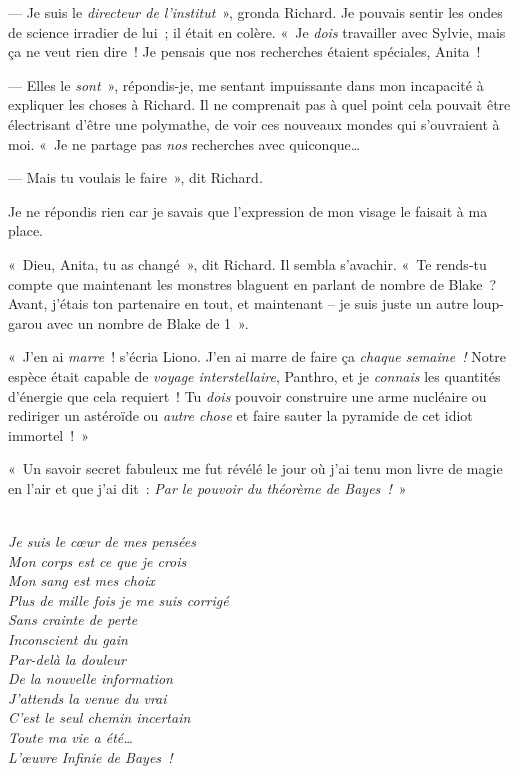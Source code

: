 --- Je suis le \emph{directeur de l'institut}~», gronda Richard.
Je pouvais sentir les ondes de science irradier de lui~; il était en colère.
«~Je \emph{dois} travailler avec Sylvie, mais ça ne veut rien dire~!
Je pensais que nos recherches étaient spéciales, Anita~!

--- Elles le \emph{sont}~», répondis-je, me sentant impuissante dans mon incapacité à expliquer les choses à Richard.
Il ne comprenait pas à quel point cela pouvait être électrisant d'être une polymathe, de voir ces nouveaux mondes qui s'ouvraient à moi.
«~Je ne partage pas \emph{nos} recherches avec quiconque…

--- Mais tu voulais le faire~», dit Richard.

Je ne répondis rien car je savais que l'expression de mon visage le faisait à ma place.

«~Dieu, Anita, tu as changé~», dit Richard.
Il sembla s'avachir.
«~Te rends-tu compte que maintenant les monstres blaguent en parlant de nombre de Blake~?
Avant, j'étais ton partenaire en tout, et maintenant -- je suis juste un autre loup-garou avec un nombre de Blake de 1~».


«~J'en ai \emph{marre}~! s'écria Liono.
J'en ai marre de faire ça \emph{chaque semaine~!} Notre espèce était capable de \emph{voyage interstellaire}, Panthro, et je \emph{connais} les quantités d'énergie que cela requiert~!
Tu \emph{dois} pouvoir construire une arme nucléaire ou rediriger un astéroïde ou \emph{autre chose} et faire sauter la pyramide de cet idiot immortel~!~»

\clearpage
{}

«~Un savoir secret fabuleux me fut révélé le jour où j'ai tenu mon livre de magie en l'air et que j'ai dit~: \emph{Par le pouvoir du théorème de Bayes~!}~»


\emph{
\\
Je suis le cœur de mes pensées\\
Mon corps est ce que je crois\\
Mon sang est mes choix\\
Plus de mille fois je me suis corrigé\\
Sans crainte de perte\\
Inconscient du gain\\
Par-delà la douleur\\
De la nouvelle information\\
J'attends la venue du vrai\\
C'est le seul chemin incertain\\
Toute ma vie a été…\\
L'œuvre Infinie de Bayes~!
}

